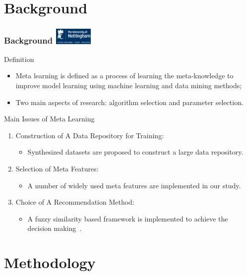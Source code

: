 \documentclass[aspectratio=1610]{beamer}
\newcommand{\UoN}
  {\hfill {\includegraphics[height=0.8cm]{nott_logo/nott_logo_white.png}}}
\begin{document}
\section{Background}
\begin{frame}
\frametitle{Background \UoN}
	\begin{block}{Definition}
		\begin{itemize}
			\item Meta learning is defined as a process of learning the meta-knowledge to improve model learning using machine learning and data mining methods;
			\item Two main aspects of research: algorithm selection and parameter selection.
		\end{itemize}
	\end{block}
		
	\begin{block}{Main Issues of Meta Learning}
		\begin{enumerate}
			\item Construction of A Data Repository for Training:
				\begin{itemize}
					\item Synthesized datasets are proposed to construct a large data repository.
				\end{itemize}
			\item Selection of Meta Features:
				\begin{itemize}
					\item A number of widely used meta features are implemented in our study.
				\end{itemize}
			\item Choice of A Recommendation Method:
				\begin{itemize}
					\item A fuzzy similarity based framework is implemented to achieve the decision making~.
				\end{itemize}
		\end{enumerate}
	\end{block}
\end{frame}


\section{Methodology}
\end{document}

